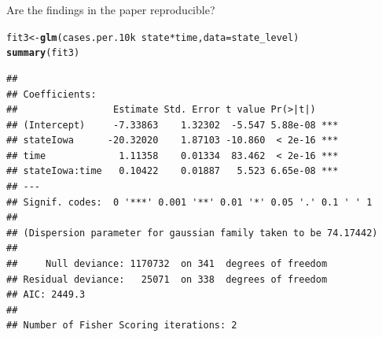 \documentclass[10pt,handout]{beamer}\usepackage[]{graphicx}\usepackage[]{color}
\makeatletter
\def\maxwidth{ %
  \ifdim\Gin@nat@width>\linewidth
    \linewidth
  \else
    \Gin@nat@width
  \fi
}
\newcommand{\hlstr}[1]{\textcolor[rgb]{0.192,0.494,0.8}{#1}}%
\newcommand{\hlopt}[1]{\textcolor[rgb]{0,0,0}{#1}}%
\newcommand{\hlstd}[1]{\textcolor[rgb]{0.345,0.345,0.345}{#1}}%
\newcommand{\hlkwb}[1]{\textcolor[rgb]{0.69,0.353,0.396}{#1}}%
\newcommand{\hlkwc}[1]{\textcolor[rgb]{0.333,0.667,0.333}{#1}}%
\newcommand{\hlkwd}[1]{\textcolor[rgb]{0.737,0.353,0.396}{\textbf{#1}}}%
\newenvironment{kframe}{%
 \def\at@end@of@kframe{}%
 \ifinner\ifhmode%
  \def\at@end@of@kframe{\end{minipage}}%
  \begin{minipage}{\columnwidth}%
 \fi\fi%
 \def\FrameCommand##1{\hskip\@totalleftmargin \hskip-\fboxsep
 \colorbox{shadecolor}{##1}\hskip-\fboxsep
     \hskip-\linewidth \hskip-\@totalleftmargin \hskip\columnwidth}%
 \MakeFramed {\advance\hsize-\width
   \@totalleftmargin\z@ \linewidth\hsize
   \@setminipage}}%
 {\par\unskip\endMakeFramed%
 \at@end@of@kframe}
\newenvironment{knitrout}{}{} %
\makeatother
\begin{document}
\begin{frame}[fragile]{Are the findings in the paper reproducible?}
	
\begin{knitrout}\tiny
{}\color{fgcolor}\begin{kframe}
\begin{alltt}
\hlstd{fit3} \hlkwb{<-} \hlkwd{glm}\hlstd{(cases.per.10k} \hlopt{~} \hlstd{state}\hlopt{*}\hlstd{time,} \hlkwc{data} \hlstd{= state_level)}
\hlkwd{summary}\hlstd{(fit3)}
\end{alltt}
\begin{verbatim}
## 
## Coefficients:
##                 Estimate Std. Error t value Pr(>|t|)    
## (Intercept)     -7.33863    1.32302  -5.547 5.88e-08 ***
## stateIowa      -20.32020    1.87103 -10.860  < 2e-16 ***
## time             1.11358    0.01334  83.462  < 2e-16 ***
## stateIowa:time   0.10422    0.01887   5.523 6.65e-08 ***
## ---
## Signif. codes:  0 '***' 0.001 '**' 0.01 '*' 0.05 '.' 0.1 ' ' 1
## 
## (Dispersion parameter for gaussian family taken to be 74.17442)
## 
##     Null deviance: 1170732  on 341  degrees of freedom
## Residual deviance:   25071  on 338  degrees of freedom
## AIC: 2449.3
## 
## Number of Fisher Scoring iterations: 2
\end{verbatim}
\end{kframe}
\end{knitrout}
	
\end{frame}


\end{document}
